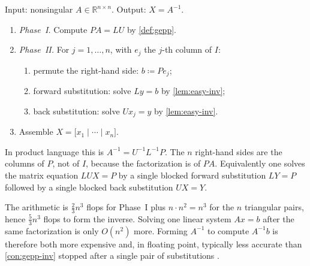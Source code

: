 \begin{construction}
\label{con:gepp-inv}
Input: nonsingular \(A\in\mathbb{R}^{n\times n}\). Output: \(X=A^{-1}\).

\begin{enumerate}[label=\textup{(\arabic*)}]
    \item \emph{Phase~I.} Compute \(PA=LU\) by \cref{def:gepp}.
    \item \emph{Phase~II.} For \(j=1,\ldots,n\), with \(e_{j}\) the \(j\)-th column of \(I\):
    \begin{enumerate}[label=\textup{(\alph*)}]
        \item permute the right-hand side: \(b \coloneqq P e_{j}\);
        \item forward substitution: solve \(L y = b\) by \cref{lem:easy-inv};
        \item back substitution: solve \(U x_{j} = y\) by \cref{lem:easy-inv}.
    \end{enumerate}
    \item Assemble \(X=\bigl[x_{1}\mid\cdots\mid x_{n}\bigr]\).
\end{enumerate}

In product language this is \(A^{-1}=U^{-1}L^{-1}P\). The \(n\) right-hand sides are the columns of \(P\), not of \(I\), because the factorization is of \(PA\). Equivalently one solves the matrix equation \(LUX=P\) by a single blocked forward substitution \(LY=P\) followed by a single blocked back substitution \(UX=Y\).
\end{construction}

The arithmetic is \(\frac23 n^{3}\) flops for Phase~I plus \(n\cdot n^{2}=n^{3}\) for the \(n\) triangular pairs, hence \(\frac53 n^{3}\) flops to form the inverse. Solving one linear system \(Ax=b\) after the same factorization is only \(O(n^{2})\) more. Forming \(A^{-1}\) to compute \(A^{-1}b\) is therefore both more expensive and, in floating point, typically less accurate than \cref{con:gepp-inv} stopped after a single pair of substitutions \cite{golub96,trefethen97}.

